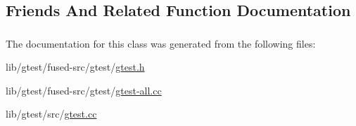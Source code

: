 \subsection{Friends And Related Function Documentation}
\hypertarget{classtesting_1_1_test_case_aa684cc13a8f91b00c0c9ce41ec7474eb}{
\subsubsection[{internal\-::\-Unit\-Test\-Impl}]{\hspace{0.3cm}{\ttfamily [friend]}}}\label{classtesting_1_1_test_case_aa684cc13a8f91b00c0c9ce41ec7474eb}
\hypertarget{classtesting_1_1_test_case_ab085d1bf4cff8b1045750706b11f8662}{
\subsubsection[{Test}]{\hspace{0.3cm}{\ttfamily [friend]}}}\label{classtesting_1_1_test_case_ab085d1bf4cff8b1045750706b11f8662}


The documentation for this class was generated from the following files\-:\begin{DoxyCompactItemize}
\item 
lib/gtest/fused-\/src/gtest/\hyperlink{fused-src_2gtest_2gtest_8h}{gtest.\-h}\item 
lib/gtest/fused-\/src/gtest/\hyperlink{fused-src_2gtest_2gtest-all_8cc}{gtest-\/all.\-cc}\item 
lib/gtest/src/\hyperlink{gtest_8cc}{gtest.\-cc}\end{DoxyCompactItemize}

